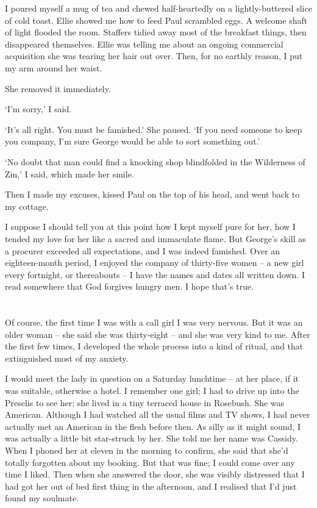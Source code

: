 I poured myself a mug of tea and chewed half-heartedly on a lightly-buttered slice of cold toast. Ellie showed me how to feed Paul scrambled eggs. A welcome shaft of light flooded the room. Staffers tidied away most of the breakfast things, then disappeared themselves. Ellie was telling me about an ongoing commercial acquisition she was tearing her hair out over. Then, for no earthly reason, I put my arm around her waist.

She removed it immediately.

`I'm sorry,' I said.

`It's all right. You must be famished.' She paused. `If you need someone to keep you company, I'm sure George would be able to sort something out.'

`No doubt that man could find a knocking shop blindfolded in the Wilderness of Zin,' I said, which made her smile.

Then I made my excuses, kissed Paul on the top of his head, and went back to my cottage.

I suppose I should tell you at this point how I kept myself pure for her, how I tended my love for her like a sacred and immaculate flame. But George's skill as a procurer exceeded all expectations, and I was indeed famished. Over an eighteen-month period, I enjoyed the company of thirty-five women -- a new girl every fortnight, or thereabouts -- I have the names and dates all written down. I read somewhere that God forgives hungry men. I hope that's true.

\section{}

Of course, the first time I was with a call girl I was very nervous. But it was an older woman -- she said she was thirty-eight -- and she was very kind to me. After the first few times, I developed the whole process into a kind of ritual, and that extinguished most of my anxiety.

I would meet the lady in question on a Saturday lunchtime -- at her place, if it was suitable, otherwise a hotel. I remember one girl; I had to drive up into the Preselis to see her; she lived in a tiny terraced house in Rosebush. She was American. Although I had watched all the usual films and TV shows, I had never actually met an American in the flesh before then. As silly as it might sound, I was actually a little bit star-struck by her. She told me her name was Cassidy. When I phoned her at eleven in the morning to confirm, she said that she'd totally forgotten about my booking. But that was fine; I could come over any time I liked. Then when she answered the door, she was visibly distressed that I had got her out of bed first thing in the afternoon, and I realised that I'd just found my soulmate.

